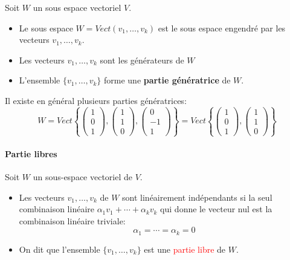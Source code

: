 

Soit $W$ un sous espace vectoriel $V$.
\begin{itemize}
    \item Le sous espace $W = Vect(v_1, \dots, v_k)$ est le sous espace engendré par les vecteurs $v_1, \dots, v_k$.
    \item Les vecteurs $v_1, \dots, v_k$ sont les générateurs de $W$
    \item L'ensemble $\{v_1, \dots, v_k\}$ forme une \textbf{partie génératrice} de $W$.
\end{itemize}
\begin{exemple}
    Il existe en général plusieurs parties génératrices:
    \[W = Vect\left\{\begin{pmatrix}
        1 \\ 0 \\ 1
    \end{pmatrix}, \begin{pmatrix}
        1 \\ 1 \\ 0
    \end{pmatrix}, \begin{pmatrix}
        0 \\ -1 \\ 1
    \end{pmatrix}\right\} = Vect\left\{\begin{pmatrix}
        1 \\ 0 \\ 1
    \end{pmatrix}, \begin{pmatrix}
        1 \\ 1 \\ 0
    \end{pmatrix}\right\}\]
\end{exemple}
\paragraph{Partie libres}
Soit $W$ un sous-espace vectoriel de $V$.
\begin{itemize}
    \item Les vecteurs $v_1, \dots, v_k$ de $W$ sont linéairement indépendants si la seul combinaison linéaire $\alpha_1v_1 + \cdots + \alpha_kv_k$ qui donne le vecteur nul est la combinaison linéaire triviale:
    \[\alpha_1 = \cdots = \alpha_k = 0\]

    \item On dit que l'ensemble $\{v_1, \dots, v_k\}$ est une \textcolor{red}{partie libre} de $W$.
\end{itemize}

